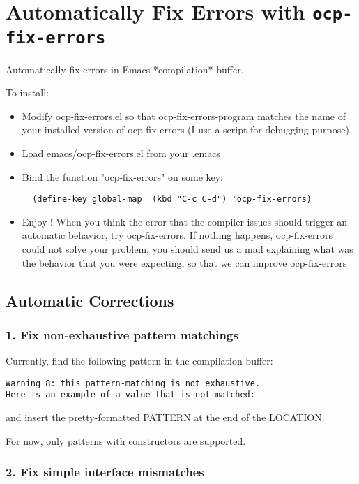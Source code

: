 \chapter{Automatically Fix Errors with {\tt ocp-fix-errors}}

Automatically fix errors in Emacs *compilation* buffer.

To install:
\begin{itemize}
\item Modify ocp-fix-errors.el so that ocp-fix-errors-program matches
   the name of your installed version of ocp-fix-errors (I use a script
   for debugging purpose)
\item Load emacs/ocp-fix-errors.el from your .emacs
\item Bind the function "ocp-fix-errors" on some key:

\begin{verbatim}
  (define-key global-map  (kbd "C-c C-d") 'ocp-fix-errors)
\end{verbatim}

\item Enjoy ! When you think the error that the compiler issues should
   trigger an automatic behavior, try ocp-fix-errors. If nothing
   happens, ocp-fix-errors could not solve your problem, you should
   send us a mail explaining what was the behavior that you were
   expecting, so that we can improve ocp-fix-errors
\end{itemize}

\section{Automatic Corrections}

\subsection{1. Fix non-exhaustive pattern matchings}

Currently, find the following pattern in the compilation buffer:

\begin{verbatim}
Warning 8: this pattern-matching is not exhaustive.
Here is an example of a value that is not matched:
\end{verbatim}

and insert the pretty-formatted PATTERN at the end of the LOCATION.

For now, only patterns with constructors are supported.

\subsection{2. Fix simple interface mismatches}

